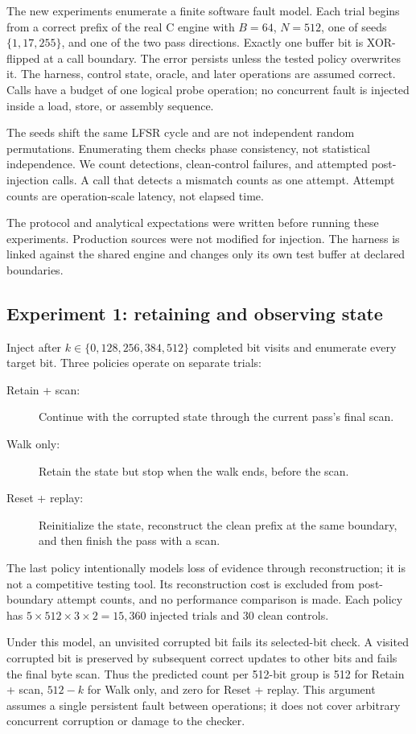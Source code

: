 \documentclass[10pt,twocolumn,letterpaper]{article}
\begin{document}
The new experiments enumerate a finite software fault model. Each trial begins from a correct prefix of the real C engine with $B=64$, $N=512$, one of seeds $\{1,17,255\}$, and one of the two pass directions. Exactly one buffer bit is XOR-flipped at a call boundary. The error persists unless the tested policy overwrites it. The harness, control state, oracle, and later operations are assumed correct. Calls have a budget of one logical probe operation; no concurrent fault is injected inside a load, store, or assembly sequence.

The seeds shift the same LFSR cycle and are not independent random permutations. Enumerating them checks phase consistency, not statistical independence. We count detections, clean-control failures, and attempted post-injection calls. A call that detects a mismatch counts as one attempt. Attempt counts are operation-scale latency, not elapsed time.

The protocol and analytical expectations were written before running these experiments. Production sources were not modified for injection. The harness is linked against the shared engine and changes only its own test buffer at declared boundaries.

\subsection{Experiment 1: retaining and observing state}
Inject after $k\in\{0,128,256,384,512\}$ completed bit visits and enumerate every target bit. Three policies operate on separate trials:
\begin{description}
\item[Retain + scan:] Continue with the corrupted state through the current pass's final scan.
\item[Walk only:] Retain the state but stop when the walk ends, before the scan.
\item[Reset + replay:] Reinitialize the state, reconstruct the clean prefix at the same boundary, and then finish the pass with a scan.
\end{description}
The last policy intentionally models loss of evidence through reconstruction; it is not a competitive testing tool. Its reconstruction cost is excluded from post-boundary attempt counts, and no performance comparison is made. Each policy has $5\times512\times3\times2=15{,}360$ injected trials and 30 clean controls.

Under this model, an unvisited corrupted bit fails its selected-bit check. A visited corrupted bit is preserved by subsequent correct updates to other bits and fails the final byte scan. Thus the predicted count per 512-bit group is 512 for Retain + scan, $512-k$ for Walk only, and zero for Reset + replay. This argument assumes a single persistent fault between operations; it does not cover arbitrary concurrent corruption or damage to the checker.
\end{document}
